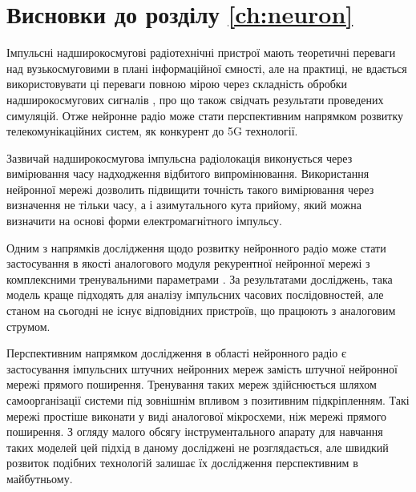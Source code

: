 \section*{Висновки до розділу \ref{ch:neuron}}

Імпульсні надширокосмугові радіотехнічні пристрої мають теоретичні переваги 
над вузькосмуговими в плані інформаційної ємності, але на практиці, не 
вдається використовувати ці переваги повною мірою через складність обробки 
надширокосмугових сигналів \cite{imp:ChannelLimitations}, про що також 
свідчать результати проведених симуляцій. Отже нейронне радіо може стати 
перспективним напрямком розвитку телекомунікаційних систем, як
конкурент до 5G технології.

Зазвичай надширокосмугова імпульсна радіолокація виконується 
через вимірювання часу надходження відбитого випромінювання. Використання 
нейронної мережі дозволить підвищити точність такого вимірювання через 
визначення не тільки часу, а і азимутального кута прийому, який можна 
визначити на основі форми електромагнітного імпульсу.

Одним з напрямків дослідження щодо розвитку нейронного радіо може стати
застосування в якості аналогового модуля рекурентної нейронної мережі з 
комплексними тренувальними параметрами \cite{imp:NIPS2018}. За результатами 
досліджень, така модель краще підходять для аналізу імпульсних часових 
послідовностей, але станом на сьогодні не існує відповідних пристроїв, що 
працюють з аналоговим струмом.

Перспективним напрямком дослідження в області нейронного радіо є 
застосування імпульсних штучних нейронних мереж замість штучної нейронної 
мережі прямого поширення. Тренування таких мереж здійснюється шляхом 
самоорганізації системи під зовнішнім впливом з позитивним підкріпленням. 
Такі мережі простіше виконати у виді аналогової мікросхеми, ніж мережі
прямого поширення. З огляду малого обсягу інструментального 
апарату для навчання таких моделей цей підхід в даному досліджені не 
розглядається, але швидкий розвиток подібних технологій залишає їх 
дослідження перспективним в майбутньому.




